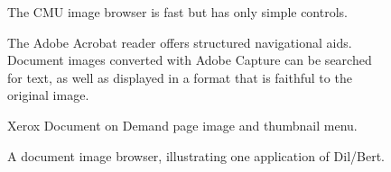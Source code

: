 \begin{figure}
\caption
{The CMU image browser is fast but has only simple controls.}
\label{mercury}
\end{figure}

\begin{figure}
\caption
{The Adobe Acrobat reader offers structured navigational aids.
Document images converted with Adobe Capture can be searched for text,
as well as displayed in a format that is faithful to the original
image.}
\label{acrobat}
\end{figure}

\begin{figure}
\caption
{Xerox Document on Demand page image and thumbnail menu.}
\label{docuweb}
\end{figure}

\begin{figure}
\caption
{A document image browser, illustrating one application of Dil/Bert.}
\label{ImageBrowser}
\end{figure}


